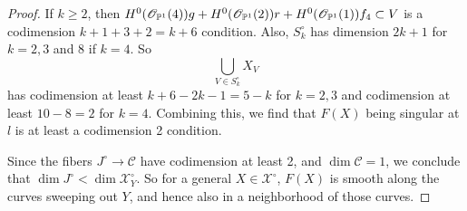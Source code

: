 \begin{proof}
 If $k \geq 2$, then $H^0(\mathscr{O}_{\mathbb{P}^1}(4))g + H^0(\mathscr{O}_{\mathbb{P}^1}(2))r + H^0(\mathscr{O}_{\mathbb{P}^1}(1))f_4 \subset V$ is a codimension $k+1+3+2 = k+6$ condition. Also, $S_k^\circ$ has dimension $2k+1$ for $k=2,3$ and $8$ if $k=4$. So 
\[\bigcup_{V \in S_k^\circ} X_V\]
has codimension at least $k+6-2k-1 = 5-k$ for $k=2,3$ and codimension at least $10-8=2$ for $k=4$. Combining this, we find that $F(X)$ being singular at $l$ is at least a codimension 2 condition.

Since the fibers $J^\circ \to \mathcal{C}$ have codimension at least 2, and $\dim \mathcal{C} = 1$, we conclude that $\dim J^\circ < \dim \mathscr{X}_Y^\circ$. So for a general $X \in \mathscr{X}^\circ$, $F(X)$ is smooth along the curves sweeping out $Y$, and hence also in a neighborhood of those curves.
\end{proof}

